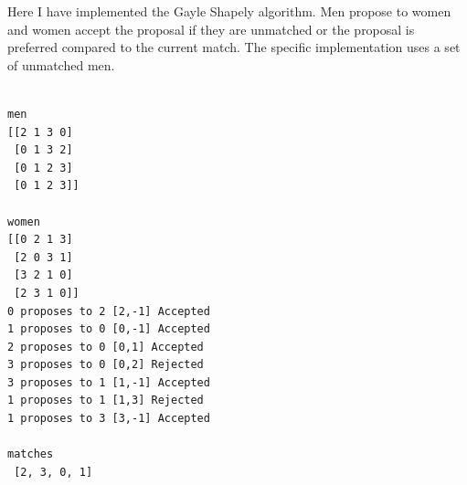 \documentclass{homeworg}
\begin{document}
Here I have implemented the Gayle Shapely algorithm. Men propose to women and women accept the proposal if they are unmatched or the proposal is preferred compared to the current match. The specific implementation uses a set of unmatched men.
\begin{verbatim}

men
[[2 1 3 0] 
 [0 1 3 2] 
 [0 1 2 3] 
 [0 1 2 3]]

women      
[[0 2 1 3] 
 [2 0 3 1] 
 [3 2 1 0] 
 [2 3 1 0]]
0 proposes to 2 [2,-1] Accepted
1 proposes to 0 [0,-1] Accepted
2 proposes to 0 [0,1] Accepted
3 proposes to 0 [0,2] Rejected
3 proposes to 1 [1,-1] Accepted
1 proposes to 1 [1,3] Rejected
1 proposes to 3 [3,-1] Accepted

matches
 [2, 3, 0, 1]

\end{verbatim}
\end{document}
